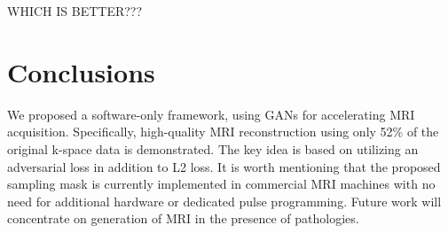\documentclass[review]{elsarticle}
\begin{document}
WHICH IS BETTER???
\begin{table}[H]
	\centering
	\caption{\textcolor{black}{\footnotesize{}{}Segmentation Dice score for different sampling ratios}{\footnotesize{}\label{tbl:DICE2}}}
\end{table}




\section{Conclusions}


We proposed a software-only framework, using GANs for accelerating
MRI acquisition. Specifically, high-quality MRI reconstruction using
only 52\% of the original k-space data is demonstrated. The key idea
is based on utilizing an adversarial loss in addition to L2 loss.
It is worth mentioning that the proposed sampling mask is currently
implemented in commercial MRI machines with no need for additional
hardware or dedicated pulse programming. Future work will concentrate
on generation of MRI in the presence of pathologies.


\end{document}

